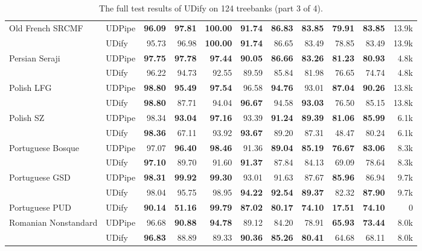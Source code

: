 \documentclass[11pt,a4paper]{article}
\begin{document}
\begin{table*}
\begin{center}
\begin{tabular}{@{}llrrrrrrrrr@{}}
    \addlinespace
    Old French SRCMF & UDPipe &  \bf 96.09 &  \bf 97.81 &  \bf 100.00 &  \bf 91.74 &  \bf 86.83 &  \bf 83.85 &  \bf 79.91 &  \bf 83.85 &  13.9k \\
               & UDify &      95.73 &      96.98 &  \bf 100.00 &  \bf 91.74 &      86.65 &      83.49 &      78.85 &      83.49 &  13.9k \\
    \addlinespace
    Persian Seraji & UDPipe &  \bf 97.75 &  \bf 97.78 &   \bf 97.44 &  \bf 90.05 &  \bf 86.66 &  \bf 83.26 &  \bf 81.23 &  \bf 80.93 &   4.8k \\
               & UDify &      96.22 &      94.73 &       92.55 &      89.59 &      85.84 &      81.98 &      76.65 &      74.74 &   4.8k \\
    \addlinespace
    Polish LFG & UDPipe &  \bf 98.80 &  \bf 95.49 &   \bf 97.54 &      96.58 &  \bf 94.76 &      93.01 &  \bf 87.04 &  \bf 90.26 &  13.8k \\
               & UDify &  \bf 98.80 &      87.71 &       94.04 &  \bf 96.67 &      94.58 &  \bf 93.03 &      76.50 &      85.15 &  13.8k \\
    \addlinespace
    Polish SZ & UDPipe &      98.34 &  \bf 93.04 &   \bf 97.16 &      93.39 &  \bf 91.24 &  \bf 89.39 &  \bf 81.06 &  \bf 85.99 &   6.1k \\
               & UDify &  \bf 98.36 &      67.11 &       93.92 &  \bf 93.67 &      89.20 &      87.31 &      48.47 &      80.24 &   6.1k \\
    \addlinespace
    Portuguese Bosque & UDPipe &      97.07 &  \bf 96.40 &   \bf 98.46 &      91.36 &  \bf 89.04 &  \bf 85.19 &  \bf 76.67 &  \bf 83.06 &   8.3k \\
               & UDify &  \bf 97.10 &      89.70 &       91.60 &  \bf 91.37 &      87.84 &      84.13 &      69.09 &      78.64 &   8.3k \\
    \addlinespace
    Portuguese GSD & UDPipe &  \bf 98.31 &  \bf 99.92 &   \bf 99.30 &      93.01 &      91.63 &      87.67 &  \bf 85.96 &      86.94 &   9.7k \\
               & UDify &      98.04 &      95.75 &       98.95 &  \bf 94.22 &  \bf 92.54 &  \bf 89.37 &      82.32 &  \bf 87.90 &   9.7k \\
    \addlinespace
    Portuguese PUD & UDify &  \bf 90.14 &  \bf 51.16 &   \bf 99.79 &  \bf 87.02 &  \bf 80.17 &  \bf 74.10 &  \bf 17.51 &  \bf 74.10 &      0 \\
    \addlinespace
    Romanian Nonstandard & UDPipe &      96.68 &  \bf 90.88 &   \bf 94.78 &      89.12 &      84.20 &      78.91 &  \bf 65.93 &  \bf 73.44 &   8.0k \\
               & UDify &  \bf 96.83 &      88.89 &       89.33 &  \bf 90.36 &  \bf 85.26 &  \bf 80.41 &      64.68 &      68.11 &   8.0k \\
    \bottomrule
    \end{tabular}
    \end{center}
    \caption{\label{table:full-results-3} The full test results of UDify on 124 treebanks (part 3 of 4).}
\end{table*}
\end{document}
